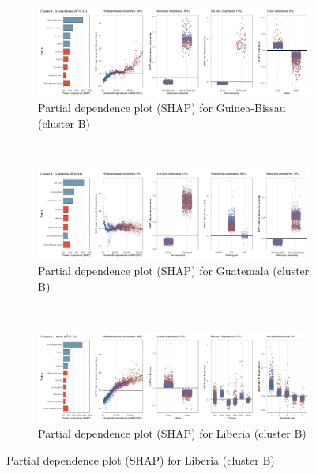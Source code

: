 \begin{figure}[ht!]\ContinuedFloat
    \centering
   \begin{subfigure}[b]{\textwidth}
           \centering
         \caption{Partial dependence plot (SHAP) for Guinea-Bissau (cluster B)}
         \label{fig:5b_GNB}
         \includegraphics[width=\textwidth]{Figure 5b/Figure_5b_GNB}
         \end{subfigure}
    \\
    \vspace{0.5cm}
   \begin{subfigure}[b]{\textwidth}
   \centering
         \caption{Partial dependence plot (SHAP) for Guatemala (cluster B)}
         \label{fig:5b_GTM}
         \includegraphics[width=\textwidth]{Figure 5b/Figure_5b_GTM}
     \end{subfigure}
    \\
    \vspace{0.5cm}
   \begin{subfigure}[b]{\textwidth}
   \centering
         \caption{Partial dependence plot (SHAP) for Liberia (cluster B)}
         \label{fig:5b_LBR}
         \includegraphics[width=\textwidth]{Figure 5b/Figure_5b_LBR}

\end{subfigure}
\end{figure}
